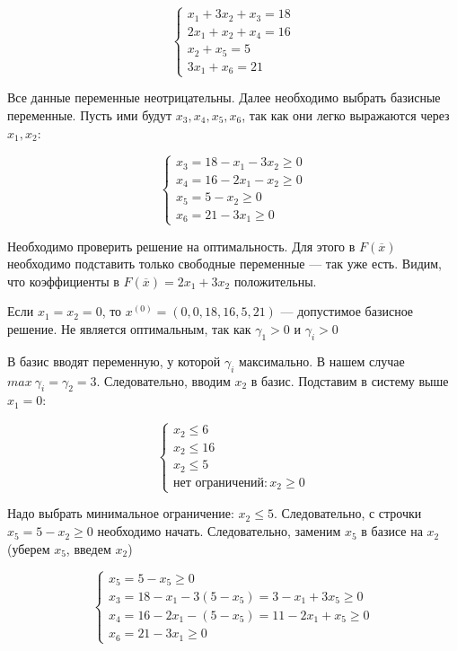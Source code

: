\documentclass{article}
\begin{document}
$$
\begin{cases}
  x_1 + 3x_2 + x_3 = 18 \\
  2x_1 + x_2 + x_4 = 16 \\
  x_2 + x_5 = 5 \\
  3x_1 + x_6 = 21  
\end{cases}
$$

Все данные переменные неотрицательны. Далее необходимо выбрать базисные переменные. Пусть ими будут $x_3, x_4, x_5, x_6$, так как они легко выражаются через $x_1, x_2$:

$$
\begin{cases}
    x_3 = 18 - x_1 - 3x_2 \ge 0 \\
    x_4 = 16 - 2x_1 - x_2 \ge 0 \\
    x_5 = 5 - x_2 \ge 0 \\
    x_6 = 21 - 3x_1 \ge 0
\end{cases}
$$

Необходимо проверить решение на оптимальность. Для этого в $F(\overline{x})$ необходимо подставить только свободные переменные — так уже есть. Видим, что коэффициенты в $F(\overline{x}) = 2x_1 + 3x_2$ положительны.

Если $x_1 = x_2 = 0$, то $x^{(0)} = (0, 0, 18, 16, 5, 21)$ — допустимое базисное решение. Не является оптимальным, так как $\gamma_1 > 0$ и $\gamma_i > 0$

В базис вводят переменную, у которой $\gamma_i$ максимально. В нашем случае $max \ \gamma_i = \gamma_2 = 3$. Следовательно, вводим $x_2$ в базис. Подставим в систему выше $x_1 = 0$:

$$
\begin{cases}
  x_2 \le 6 \\
  x_2 \le 16 \\
  x_2 \le 5 \\
  \text{нет ограничений}: x_2 \ge 0
\end{cases}
$$

Надо выбрать минимальное ограничение: $x_2 \le 5$. Следовательно, с строчки $x_5 = 5 - x_2 \ge 0$ необходимо начать. Следовательно, заменим $x_5$ в базисе на $x_2$ (уберем $x_5$, введем $x_2$)

$$
\begin{cases}
    x_5 = 5 - x_5 \ge 0 \\
    x_3 = 18 - x_1 - 3 (5 - x_5) = 3 - x_1 + 3x_5 \ge 0\\
    x_4 = 16 - 2x_1 - (5 - x_5) = 11 - 2x_1 + x_5 \ge 0\\
    x_6 = 21 - 3x_1 \ge 0
\end{cases}
$$
\end{document}
